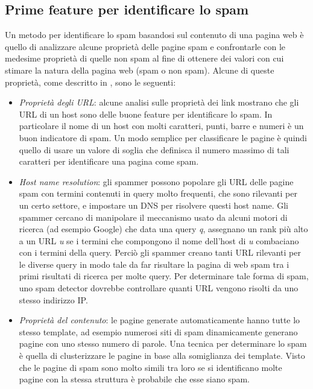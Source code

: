 \subsection{Prime feature per identificare lo spam}
\label{subsec:Feature}
Un metodo per identificare lo spam basandosi sul contenuto di una pagina web è quello di analizzare alcune proprietà delle pagine spam e confrontarle  con le medesime proprietà di quelle non spam al fine di ottenere dei valori con cui stimare la natura della pagina web (spam o non spam). Alcune di queste proprietà, come descritto in \cite{Fetterly:2004:SDS:1017074.1017077}, sono le seguenti:
\begin{itemize}
 \item 	\textit{Proprietà degli URL}: alcune analisi sulle proprietà dei link mostrano che gli URL di un host sono delle buone feature per identificare lo spam. In particolare il nome di un host con molti caratteri, punti, barre e numeri è un buon indicatore di spam. Un modo semplice per classificare le pagine è quindi quello di usare un valore di soglia che definisca il numero massimo di tali caratteri per identificare una pagina come spam. 
 
 \item \textit{Host name resolution}: gli spammer possono popolare gli URL delle pagine spam con termini contenuti in query molto frequenti, che sono rilevanti per un certo settore,  e impostare un DNS per risolvere questi host name. Gli spammer cercano di manipolare il meccanismo  usato da alcuni motori di ricerca (ad esempio Google) che data una query \textit{q}, assegnano un rank più alto a un URL \textit{u} se i termini che compongono  il nome dell'host di \textit{u} combaciano con i termini della query. Perciò gli spammer creano tanti URL rilevanti per le diverse query in modo tale da far risultare la pagina di web spam tra i primi risultati di ricerca per molte query. Per determinare tale forma di spam, uno spam detector dovrebbe controllare quanti URL vengono risolti da uno stesso indirizzo IP.
 
 \item \textit{Proprietà del contenuto}: le pagine generate automaticamente hanno tutte lo stesso template, ad esempio numerosi siti di spam dinamicamente generano pagine con uno stesso numero di parole. Una tecnica per determinare lo spam è quella di clusterizzare le pagine in base alla somiglianza dei template. Visto che le pagine di spam sono molto simili tra loro se si identificano molte pagine con la stessa struttura è probabile che esse siano spam.
\end{itemize}

